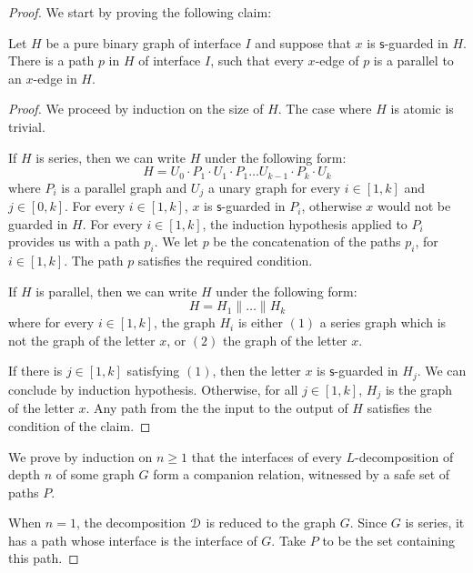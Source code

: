 \begin{proof} We start by proving the following claim:
\begin{claim}\label{new-claim-series}
Let $H$ be a pure binary graph of interface $I$ and suppose that $x$ is $\mathsf{s}$-guarded in $H$. There is a path $p$ in $H$ of interface $I$, such that every  $x$-edge of $p$ is a parallel to an $x$-edge in $H$. 
\end{claim}
\begin{proof}
We proceed by induction on the size of $H$. The case where $H$ is atomic is trivial.

 
If $H$ is series, then we can write $H$ under the following form:
 $$H=U_0\cdot P_1\cdot U_1\cdot P_1\dots U_{k-1}\cdot P_k\cdot U_k$$
  where $P_i$ is a parallel graph and $U_j$ a unary graph for every $i\in[1,k]$ and $j\in[0,k]$.
  For every $i\in[1,k]$, $x$ is $\mathsf{s}$-guarded in $P_i$, otherwise $x$ would not be guarded in $H$. For every $i\in [1,k]$, the induction hypothesis applied to $P_i$ provides us with a path $p_i$. We let $p$ be the concatenation of the paths $p_i$, for $i\in[1,k]$. The path $p$ satisfies the required condition.
\medskip

If $H$ is parallel, then we can write $H$ under the following form:
$$H=H_1\parallel\dots \parallel H_k$$
 where for every $i\in [1,k]$, the graph $H_i$ is either $(1)$ a series graph which is not the graph of the letter $x$, or $(2)$ the graph of the letter $x$.

If there is $j\in[1,k]$ satisfying $(1)$, then the letter $x$ is $\mathsf{s}$-guarded in $H_j$. We can conclude by induction hypothesis. Otherwise, for all $j\in[1,k]$, $H_j$ is the graph of the letter $x$. Any path from the the input to the output of $H$ satisfies the condition of the claim. 
 \end{proof}
 We prove by induction on $n\geq 1$ that the interfaces of every $L$-decomposition  of depth $n$ of some graph $G$ form a companion relation, witnessed by a safe set of paths $P$. 
\medskip

 When $n=1$, the decomposition $\mathcal D$ is reduced to the graph $G$. Since $G$ is series, it has a path whose interface is the interface of $G$. Take $P$ to be the set containing this path. 
\medskip


\end{proof}
